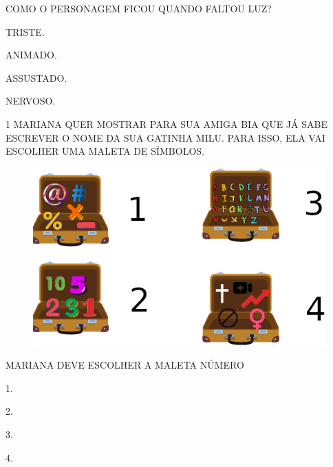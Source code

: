 COMO O PERSONAGEM FICOU QUANDO FALTOU LUZ?

\begin{escolha}[itemsep=-5pt]
\item TRISTE.

\item ANIMADO.

\item ASSUSTADO.

\item NERVOSO.
\end{escolha}

\pagebreak



\pagebreak

\num{1} MARIANA QUER MOSTRAR PARA SUA AMIGA BIA QUE JÁ SABE ESCREVER O NOME DA SUA GATINHA MILU. PARA ISSO, ELA VAI ESCOLHER UMA MALETA DE SÍMBOLOS. 

\begin{figure}[H]
\includegraphics[width=\textwidth]{media/image209.png}
\end{figure}

MARIANA DEVE ESCOLHER A MALETA NÚMERO

\begin{multicols}{4}
\begin{escolha}[itemsep=0pt]
\item 1.

\item 2.

\item 3.

\item 4.
\end{escolha}
\end{multicols}

